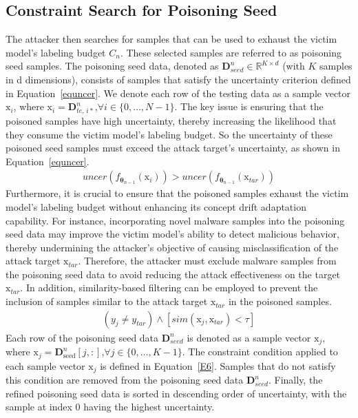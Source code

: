 \subsection{Constraint Search for Poisoning Seed}
The attacker then searches for samples that can be used to exhaust the victim model’s labeling budget $C_{n}$.
These selected samples are referred to as poisoning seed samples.
The poisoning seed data, denoted as $\bm{D}_{seed}^{n} \in \mathbb{R}^{K \times d}$ (with $K$ samples in d dimensions), consists of samples that satisfy the uncertainty criterion defined in Equation~\ref{equncer}.
We denote each row of the testing data as a sample vector $\bm{\mathrm{x}}_{i}$, where $\bm{\mathrm{x}}_{i} = \bm{D}_{te,\,i*}^{n}$,$\forall i \in \{0, \dots, N-1\}$.
The key issue is ensuring that the poisoned samples have high uncertainty, thereby increasing the likelihood that they consume the victim model's labeling budget.
So the uncertainty of these poisoned seed samples must exceed the attack target’s uncertainty, as shown in Equation~\ref{equncer}.
\begin{equation}
	\begin{aligned}
		uncer(f_{\bm{\theta}_{n-1}} \left( \bm{\mathrm{x}}_{i} \right)) > uncer(f_{\bm{\theta}_{n-1}} \left( \bm{\mathrm{x}}_{tar} \right))
	\end{aligned}
	\label{equncer}
\end{equation}
Furthermore, it is crucial to ensure that the poisoned samples exhaust the victim model’s labeling budget without enhancing its concept drift adaptation capability.
For instance, incorporating novel malware samples into the poisoning seed data may improve the victim model’s ability to detect malicious behavior, thereby undermining the attacker’s objective of causing misclassification of the attack target $\bm{\mathrm{x}}_{tar}$.
Therefore, the attacker must exclude malware samples from the poisoning seed data to avoid reducing the attack effectiveness on the target $\bm{\mathrm{x}}_{tar}$.
In addition, similarity-based filtering can be employed to prevent the inclusion of samples similar to the attack target $\bm{\mathrm{x}}_{tar}$ in the poisoned samples.
\begin{equation}
	\begin{aligned}
		(y_{j} \neq y_{tar}) \land [sim(\bm{\mathrm{x}}_{j},\bm{\mathrm{x}}_{tar})< \tau]
	\end{aligned}
	\label{E6}
\end{equation}
Each row of the poisoning seed data $\bm{D}_{seed}^{n}$ is denoted as a sample vector $\bm{\mathrm{x}}_{j}$, where $\bm{\mathrm{x}}_{j} = \bm{D}_{\text{seed}}^{n}[j,:]$,$\forall j \in \{0, \dots, K-1\}$.
The constraint condition applied to each sample vector $\bm{\mathrm{x}}_{j}$ is defined in Equation~\ref{E6}.
Samples that do not satisfy this condition are removed from the poisoning seed data $\bm{D}_{seed}^{n}$.
Finally, the refined poisoning seed data is sorted in descending order of uncertainty, with the sample at index 0 having the highest uncertainty.

